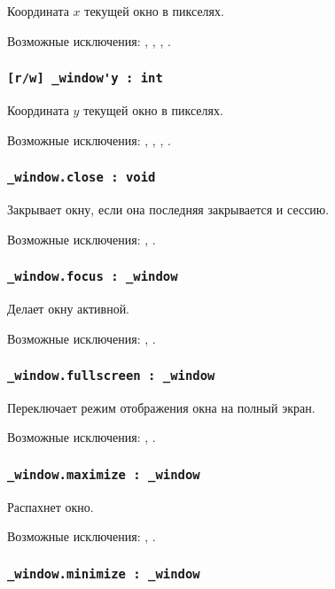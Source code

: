 Координата $x$ текущей окно в пикселях.

Возможные исключения: , , , .

\subsubsection{\lstinline|[r/w] _window'y : int|}

Координата $y$ текущей окно в пикселях.

Возможные исключения: , , , .

\subsubsection{\lstinline|_window.close : void|}

Закрывает окну, если она последняя закрывается и сессию.

Возможные исключения: , .

\subsubsection{\lstinline|_window.focus : _window|}

Делает окну активной.

Возможные исключения: , .

\subsubsection{\lstinline|_window.fullscreen : _window|}

Переключает режим отображения окна на полный экран.

Возможные исключения: , .

\subsubsection{\lstinline|_window.maximize : _window|}

Распахнет окно.

Возможные исключения: , .

\subsubsection{\lstinline|_window.minimize : _window|}

